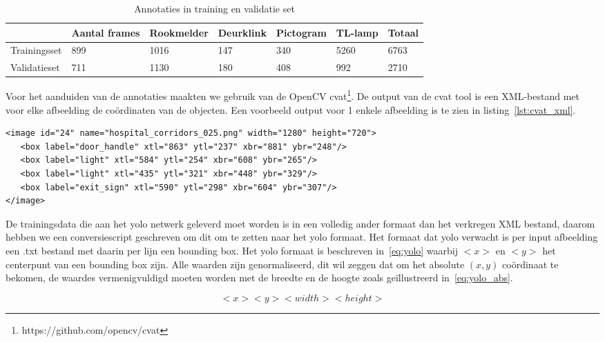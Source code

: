 \begin{table}[h]
    \caption{Annotaties in training en validatie set}\label{tab:annotaties}
    \begin{tabular}{l | l | l | l | l | l | l}
        & Aantal frames & Rookmelder & Deurklink & Pictogram & TL-lamp & Totaal \\ \hline
        Trainingsset & 899 & 1016 & 147 & 340 & 5260 & 6763 \\
        Validatieset & 711 & 1130 & 180 & 408 & 992 & 2710 \\
    \end{tabular}
\end{table}

Voor het aanduiden van de annotaties maakten we gebruik van de OpenCV \gls{cvat}\footnote{https://github.com/opencv/cvat}.
De output van de \gls{cvat} tool is een XML-bestand met voor elke afbeelding de co\"{o}rdinaten van de objecten. Een voorbeeld output voor 1 enkele afbeelding is te zien in listing~\ref{lst:cvat_xml}.

   \begin{lstlisting}[basicstyle=\small]
<image id="24" name="hospital_corridors_025.png" width="1280" height="720">
   <box label="door_handle" xtl="863" ytl="237" xbr="881" ybr="248"/>
   <box label="light" xtl="584" ytl="254" xbr="608" ybr="265"/>
   <box label="light" xtl="435" ytl="321" xbr="448" ybr="329"/>
   <box label="exit_sign" xtl="590" ytl="298" xbr="604" ybr="307"/>
</image>
   \end{lstlisting}

De trainingsdata die aan het \gls{yolo} netwerk geleverd moet worden is in een volledig ander formaat dan het verkregen XML bestand, daarom hebben we een conversiescript geschreven om dit om te zetten naar het \gls{yolo} formaat.
Het formaat dat \gls{yolo} verwacht is per input afbeelding een .txt bestand met daarin per lijn een bounding box. Het \gls{yolo} formaat is beschreven in~\ref{eq:yolo} waarbij $<x>$ en $<y>$ het centerpunt van een bounding box zijn.
Alle waarden zijn genormaliseerd, dit wil zeggen dat om het absolute $(x, y)$ co\"{o}rdinaat te bekomen, de waardes vermenigvuldigd moeten worden met de breedte en de hoogte zoals ge\"{i}llustreerd in~\ref{eq:yolo_abs}.

\begin{equation} \label{eq:yolo}
  <x> <y> <width> <height>
\end{equation}

